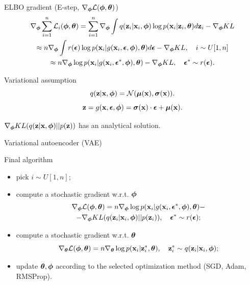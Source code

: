 \begin{frame}{ELBO gradient (E-step, $\nabla_{\bphi} \mathcal{L}(\bphi, \btheta)$)}
	\vspace{-0.3cm}
	\begin{multline*}
		\nabla_{\bphi} \sum_{i=1}^n \mathcal{L}_i (\bphi, \btheta) =  \sum_{i=1}^n \nabla_{\bphi}\int q(\bz_i|\bx_i, \bphi) \log p(\bx_i| \bz_i, \btheta)d\bz_i  - \nabla_{\bphi} KL \\ \approx  n \nabla_{\bphi}\int r(\bepsilon) \log p(\bx_i| g(\bx_i, \bepsilon, \bphi), \btheta)d\bepsilon  - \nabla_{\bphi} KL,\quad i \sim U[1, n]   \\ \approx
		n \nabla_{\bphi} \log p(\bx_i| g(\bx_i, \bepsilon^*, \bphi), \btheta)  - \nabla_{\bphi} KL , \quad \bepsilon^* \sim r(\bepsilon).
	\end{multline*}
	
	\begin{block}{Variational assumption}
		\[
		q(\bz| \bx, \bphi) = \mathcal{N} (\bmu(\bx), \bsigma(\bx)).
		\]
		\[
		\bz = g(\bx, \bepsilon, \bphi) = \bsigma(\bx) \cdot \bepsilon + \bmu(\bx).
		\]
	\end{block}
	$\nabla_{\bphi} KL (q(\bz | \bx, \bphi) || p(\bz))$ has an analytical solution.
\end{frame}
\begin{frame}{Variational autoencoder (VAE)}
	\begin{block}{Final algorithm}
		\begin{itemize}
			\item pick $i \sim U[1, n]$;
			\item compute a stochastic gradient w.r.t. $\bphi$
			\begin{multline*}
				\nabla_{\bphi} \mathcal{L} (\bphi, \btheta) = n \nabla_{\bphi} \log p(\bx_i | g(\bx_i, \bepsilon^*, \bphi), \btheta) - \\ - \nabla_{\bphi} KL (q(\bz_i|\bx_i, \bphi) || p(\bz_i)), \quad \bepsilon^* \sim r(\bepsilon);
			\end{multline*}
			\item compute a stochastic gradient w.r.t. $\btheta$
			\[
			\nabla_{\btheta} \mathcal{L} (\bphi, \btheta) = n \nabla_{\btheta} \log p(\bx_i|\bz^*_i, \btheta), \quad \bz^*_i \sim q(\bz_i|\bx_i, \bphi);
			\]
			\item update $\btheta, \bphi$ according to the selected optimization method (SGD, Adam, RMSProp).
		\end{itemize}
	\end{block}
\end{frame}
